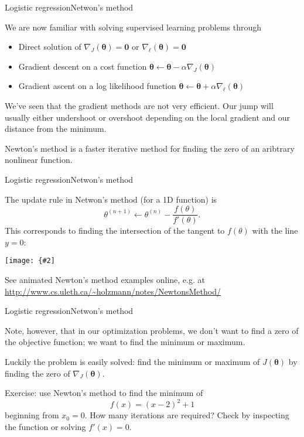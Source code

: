 \documentclass{beamer}
\renewcommand{\vec}[1]{\boldsymbol{#1}}
\newcommand{\myfig}[3]{\centerline{\texttt{[image: \{\#2]}}}
    \centerline{\scriptsize #3}}
\begin{document}
\begin{frame}{Logistic regression}{Netwon's method}

  We are now familiar with solving supervised learning problems through
  \begin{itemize}
  \item Direct solution of $\nabla_J(\vec{\theta}) =  \vec{0}$ or
    $\nabla_\ell(\vec{\theta}) =  \vec{0}$
  \item Gradient descent on a cost function $\vec{\theta} \leftarrow
    \vec{\theta} - \alpha \nabla_J(\vec{\theta})$
  \item Gradient ascent on a log likelihood function $\vec{\theta}
    \leftarrow \vec{\theta} + \alpha \nabla_\ell(\vec{\theta})$
  \end{itemize}

  We've seen that the gradient methods are not very efficient. Our
  jump will usually either \alert{undershoot} or \alert{overshoot}
  depending on the local gradient and our distance from the minimum.

  \medskip

  \alert{Newton's method} is a faster iterative method for finding the
  zero of an aribtrary nonlinear function.

\end{frame}


\begin{frame}{Logistic regression}{Netwon's method}

  The update rule in Netwon's method (for a 1D function) is
  \[ \theta^{(n+1)} \leftarrow \theta^{(n)} - \frac{f(\theta)}{f'(\theta)}. \]
  This corresponds to finding the \alert{intersection of the tangent to $f(\theta)$ with the line $y=0$}:

  \myfig{4in}{newton}{Ng, CS229 lecture note set \#1}

  \medskip

  See animated Newton's method examples online, e.g. at
  \url{http://www.cs.uleth.ca/~holzmann/notes/NewtonsMethod/}
  
\end{frame}


\begin{frame}{Logistic regression}{Netwon's method}

  Note, however, that in our optimization problems, we don't want to
  find a zero of the objective function; we want to find the
  \alert{minimum or maximum}.

  \medskip

  Luckily the problem is easily solved: \alert{find the minimum or maximum
  of $J(\vec{\theta})$ by finding the zero of $\nabla_J(\vec{\theta})$}.

  \medskip

  \alert{Exercise}: use Newton's method to find the minimum of
  \[ f(x) = (x-2)^2+1 \]
  beginning from $x_0 = 0$. How many iterations are required?
  Check by inspecting the function or solving $f'(x)=0$.

\end{frame}
\end{document}

